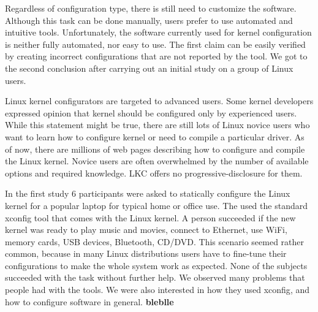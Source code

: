 \documentclass{chi2009}
\begin{document}
Regardless of configuration type, there is still need to customize the software. Although this task can be done manually, users prefer to use automated and intuitive tools. Unfortunately, the software currently used for kernel configuration is neither fully automated, nor easy to use. The first claim can be easily verified by creating incorrect configurations that are not reported by the tool. We got to the second conclusion after carrying out an initial study on a group of Linux users.

Linux kernel configurators are targeted to advanced users. Some kernel developers expressed opinion \cite{kernel:aunt:2002} that kernel should be configured only by experienced users. While this statement might be true, there are still lots of Linux novice users who want to learn how to configure kernel or need to compile a particular driver. As of now, there are millions of web pages describing how to configure and compile the Linux kernel. Novice users are often overwhelmed by the number of available options and required knowledge. LKC offers no progressive-disclosure for them.

In the first study 6 participants were asked to statically configure the Linux kernel for a popular laptop for typical home or office use. The used the standard \textsf{xconfig} tool that comes with the Linux kernel. A person succeeded if the new kernel was ready to play music and movies, connect to Ethernet, use WiFi, memory cards, USB devices, Bluetooth, CD/DVD. This scenario seemed rather common, because in many Linux distributions users have to fine-tune their configurations to make the whole system work as expected. None of the subjects succeeded with the task without further help. We observed many problems that people had with the tools. We were also interested in how they used \textsf{xconfig}, and how to configure software in general.  \textbf{bleblle}
\end{document}
